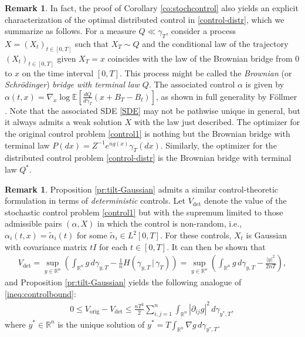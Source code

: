 \documentclass[11pt,reqno]{amsart}
\numberwithin{equation}{section}
\theoremstyle{definition}
\newtheorem{remark}[theorem]{Remark}
\def\E{{\mathbb E}}
\def\R{{\mathbb R}}
\begin{document}
	\begin{remark} \label{re:optimalcontrol}
		In fact, the proof of Corollary \ref{co:stochcontrol} also yields an explicit characterization of the optimal distributed control in  \eqref{control-distr}, which we summarize  as follows.
		For a measure $Q \ll \gamma_T$, consider a process $X=(X_t)_{t \in [0,T]}$ such that $X_T \sim Q$ and the conditional law of the trajectory $(X_t)_{t \in [0,T]}$ given $X_T=x$ coincides with the law of the Brownian bridge from $0$ to $x$ on the time interval $[0,T]$. 
		This process might be called the \emph{Brownian} (or \emph{Schr\"odinger}) \emph{bridge with terminal law $Q$}.
		The associated control $\alpha$ is given by $\alpha(t,x)=\nabla_x\log \E[\frac{dQ}{d\gamma_T}(x+B_T-B_t)]$,
		as shown in full generality by F\"ollmer \cite{follmer1985entropy,follmer1986time}.
		Note that the associated SDE \eqref{SDE} may not be pathwise unique in general, but it always admits a weak solution $X$ with the law just described.
		The optimizer for the original control problem \eqref{control1} is nothing but the Brownian bridge with terminal law $P(dx)=Z^{-1}e^{ng(x)}\gamma_T(dx)$.
		Similarly, the optimizer for the distributed control problem \eqref{control-distr} is the Brownian bridge with terminal law  $Q^*$.
	\end{remark}



\begin{remark}

Proposition \ref{pr:tilt-Gaussian} admits a similar control-theoretic formulation in terms of \emph{deterministic} controls. Let $V_{\mathrm{det}}$ denote the value of the stochastic control problem \eqref{control1} but with the supremum limited to those admissible pairs $(\alpha,X)$ in which the control is non-random, i.e., $\alpha_i(t,x)=\tilde\alpha_i(t)$ for some $\tilde\alpha_i \in L^2[0,T]$. For these controls, $X_t$ is Gaussian with covariance matrix $tI$ for each $t \in [0,T]$. It can then be shown that
\begin{align*}
V_{\mathrm{det}} = \sup_{y \in \R^n } \left(\int_{\R^n} g\,d\gamma_{y,T} - \frac{1}{n}H(\gamma_{y,T}\,|\,\gamma_T)\right) = \sup_{y \in \R^n } \left(\int_{\R^n} g\,d\gamma_{y,T} - \frac{|y|^2}{2nT}\right),
\end{align*}
and Proposition \ref{pr:tilt-Gaussian} yields the following analogue of \eqref{ineq:controlbound}:
\begin{align*}
0 \le V_{\mathrm{orig}} - V_{\mathrm{det}} \le  \frac{nT^2}{2}  \sum_{i,j=1}^n \int_{\R^n}|\partial_{ij}g|^2 \,d\gamma_{y^*,T},
\end{align*}
where $y^* \in \R^n$ is the unique solution of $y^*=T\int_{\R^n}\nabla g\,d\gamma_{y^*,T}$.

\end{remark}
\end{document}
